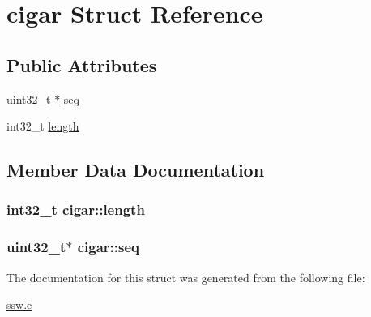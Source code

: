 \hypertarget{structcigar}{\section{cigar Struct Reference}
\label{structcigar}
}
\subsection*{Public Attributes}
\begin{DoxyCompactItemize}
\item 
uint32\-\_\-t $\ast$ \hyperlink{structcigar_a1694920d3fb2dd5c120b4d41f783f7d0}{seq}
\item 
int32\-\_\-t \hyperlink{structcigar_a43382bf5af033c8e2f811ee86cd45c57}{length}
\end{DoxyCompactItemize}


\subsection{Member Data Documentation}
\hypertarget{structcigar_a43382bf5af033c8e2f811ee86cd45c57}{
\subsubsection[{length}]{\setlength{\rightskip}{0pt plus 5cm}int32\-\_\-t cigar\-::length}}\label{structcigar_a43382bf5af033c8e2f811ee86cd45c57}
\hypertarget{structcigar_a1694920d3fb2dd5c120b4d41f783f7d0}{
\subsubsection[{seq}]{\setlength{\rightskip}{0pt plus 5cm}uint32\-\_\-t$\ast$ cigar\-::seq}}\label{structcigar_a1694920d3fb2dd5c120b4d41f783f7d0}


The documentation for this struct was generated from the following file\-:\begin{DoxyCompactItemize}
\item 
\hyperlink{ssw_8c}{ssw.\-c}\end{DoxyCompactItemize}
